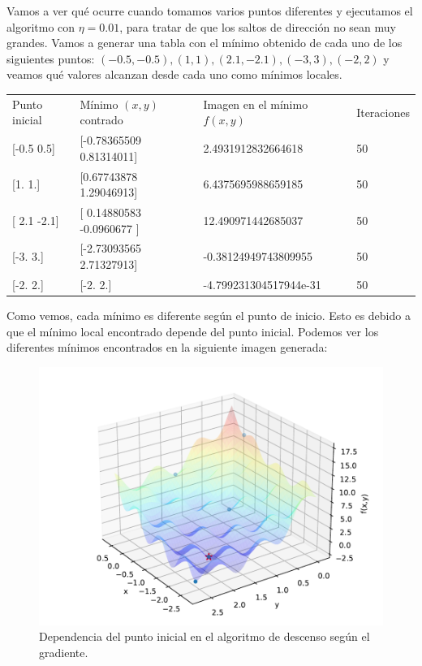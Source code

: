 \documentclass[12pt]{scrartcl}
\begin{document}
{Vamos a ver qué ocurre cuando tomamos varios puntos diferentes y ejecutamos el algoritmo con $\eta = 0.01$, para tratar de que los saltos de dirección no sean muy grandes. Vamos a generar una tabla con el mínimo obtenido de cada uno de los siguientes puntos:
$(-0.5,-0.5),(1,1),(2.1,-2.1),(-3,3),(-2,2)$ y veamos qué valores alcanzan desde cada uno como mínimos locales.

\begin{table}[H]
  \begin{tabular}{llll}
  Punto inicial   & Mínimo $(x,y)$ contrado       & Imagen en el mínimo $f(x,y)$ & Iteraciones \\
  {[}-0.5  0.5{]} & {[}-0.78365509  0.81314011{]} & 2.4931912832664618           & 50          \\
  {[}1. 1.{]}     & {[}0.67743878 1.29046913{]}   & 6.4375695988659185           & 50          \\
  {[} 2.1 -2.1{]} & {[} 0.14880583 -0.0960677 {]} & 12.490971442685037           & 50          \\
  {[}-3.  3.{]}   & {[}-2.73093565  2.71327913{]} & -0.38124949743809955         & 50          \\
  {[}-2.  2.{]}   & {[}-2.  2.{]}                 & -4.799231304517944e-31       & 50         
  \end{tabular}
\end{table}


Como vemos, cada mínimo es diferente según el punto de inicio. Esto es debido a que el mínimo local encontrado depende del punto inicial. Podemos ver los diferentes mínimos encontrados en la siguiente imagen generada:

\begin{figure}[H]
  \centering
  \includegraphics[scale=0.7]{media/E1-2-minimums-moved.pdf}
  \caption{Dependencia del punto inicial en el algoritmo de descenso según el gradiente.}
\end{figure}


}
\end{document}

